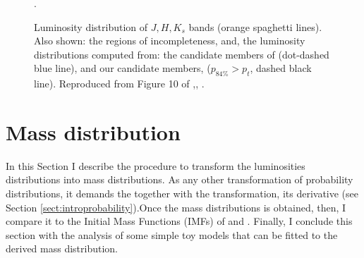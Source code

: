 \begin{figure}[htbp]
\begin{center}
\caption{Luminosity distribution of $J,H,K_s$ bands (orange spaghetti lines). Also shown: the regions of incompleteness, and, the luminosity distributions computed from: the candidate members of \citet{Bouy2015} (dot-dashed blue line), and our candidate members, ($p_{84\%}>p_t$, dashed black line). Reproduced from Figure 10 of \citet{Olivares2017},\textit{},  .}
\label{fig:Luminosities}.
\end{center}
\end{figure}

\section{Mass distribution}

In this Section I describe the procedure to transform the luminosities distributions into mass distributions. As any other transformation of probability distributions, it demands the together with the transformation, its derivative (see Section \ref{sect:introprobability}).Once the mass distributions is obtained,  then, I compare it to the Initial Mass Functions (IMFs) of \citet{Chabrier2005} and \citet{Thies2007}. Finally, I conclude this section with the analysis of some simple toy models that can be fitted to the derived mass distribution.

